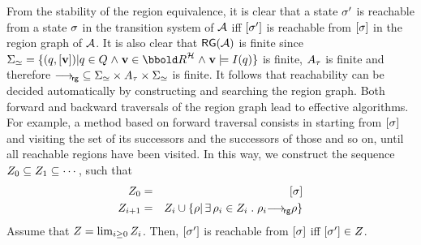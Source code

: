 {From the stability of the region equivalence, it is clear that a state
$\sigma'$ is reachable from a state $\sigma$ in the transition system
of $\AA$ iff $[\sigma']$ is reachable from $[\sigma]$ in
the region graph of $\AA$. It is also clear that $\RG(\AA)$ is finite
since $\States_\req = \{(\tgloc,\region{\clkvl}) | \tgloc \in \tglocs
\land \clkvl \in
\clkvls \land \clkvl \models
\tginv(\tgloc)\}$ is finite, $A_\tau$ is finite and therefore 
${{\mathrel{{\stackrel{}{\longrightarrow_{\mathrm{\!{\sf rg}}}}}}}} \subseteq \Sigma_\simeq \times A_\tau \times \Sigma_\simeq$
is finite. It follows that reachability can be decided automatically by
constructing and searching the region graph. Both forward and backward
traversals of the region graph lead to effective algorithms. For example,
a method based on forward traversal consists in starting from
$[\sigma]$ and visiting the set of its successors and the 
successors of those and so on, until all reachable regions have been
visited. In this way, we construct the sequence 
$Z_0 \subseteq Z_1 \subseteq \cdots$, such that
\begin{eqnarray*}
\Z_0 & = & \region{\state} \\
\Z_{i+1} & = & Z_i \cup \{\reg | \exists \reg_i \in \Z_i \such \reg_i \goesRG{} \reg \}
\end{eqnarray*} 
Assume that $Z = \lim_{i \geq 0} Z_i$. Then, 
$[\sigma']$ is reachable from $[\sigma]$ iff 
$[\sigma'] \in Z$.
 
}
